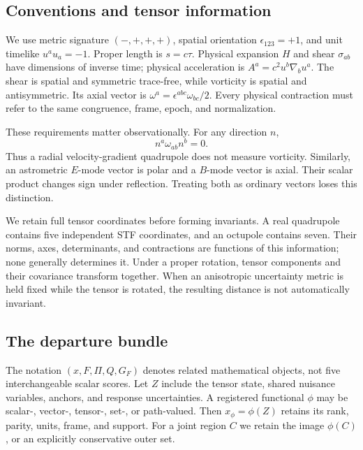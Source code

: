 \subsection{Conventions and tensor information}

We use metric signature $(-,+,+,+)$, spatial orientation $\epsilon_{123}=+1$, and unit timelike $u^a u_a=-1$. Proper length is $s=c\tau$. Physical expansion $H$ and shear $\sigma_{ab}$ have dimensions of inverse time; physical acceleration is $A^a=c^2u^b\nabla_bu^a$. The shear is spatial and symmetric trace-free, while vorticity is spatial and antisymmetric. Its axial vector is $\omega^a=\epsilon^{abc}\omega_{bc}/2$. Every physical contraction must refer to the same congruence, frame, epoch, and normalization.

These requirements matter observationally. For any direction $n$,
\begin{equation}
 n^a\omega_{ab}n^b=0.
 \label{eq:radial-vorticity}
\end{equation}
Thus a radial velocity-gradient quadrupole does not measure vorticity. Similarly, an astrometric $E$-mode vector is polar and a $B$-mode vector is axial. Their scalar product changes sign under reflection. Treating both as ordinary vectors loses this distinction.

We retain full tensor coordinates before forming invariants. A real quadrupole contains five independent STF coordinates, and an octupole contains seven. Their norms, axes, determinants, and contractions are functions of this information; none generally determines it. Under a proper rotation, tensor components and their covariance transform together. When an anisotropic uncertainty metric is held fixed while the tensor is rotated, the resulting distance is not automatically invariant.

\subsection{The departure bundle}

The notation $(x,F,\Pi,Q,G_F)$ denotes related mathematical objects, not five interchangeable scalar scores. Let $Z$ include the tensor state, shared nuisance variables, anchors, and response uncertainties. A registered functional $\phi$ may be scalar-, vector-, tensor-, set-, or path-valued. Then $x_\phi=\phi(Z)$ retains its rank, parity, units, frame, and support. For a joint region $C$ we retain the image $\phi(C)$, or an explicitly conservative outer set.

